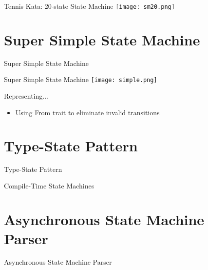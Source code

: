 \documentclass[aspectratio=169]{beamer}
\begin{document}
\begin{frame}{Tennis Kata: 20-state State Machine}
\texttt{[image: sm20.png]}
\end{frame}

\section{Super Simple State Machine}
\begin{frame}
\begin{center}
\begin{Huge}
Super Simple State Machine
\end{Huge}
\end{center}
\end{frame}

\begin{frame}{Super Simple State Machine}
\texttt{[image: simple.png]}
\begin{block}{Representing...}
\begin{itemize}
\item Using From trait to eliminate invalid transitions
\end{itemize}
\end{block}
\end{frame}

\section{Type-State Pattern}
\begin{frame}
\begin{center}
\begin{Huge}
Type-State Pattern
\end{Huge}
\linebreak
\linebreak
\begin{Large}
Compile-Time State Machines
\end{Large}
\end{center}
\end{frame}

\section{Asynchronous State Machine Parser}
\begin{frame}
\begin{center}
\begin{Large}
Asynchronous State Machine Parser
\end{Large}
\end{center}
\end{frame}
\end{document}
